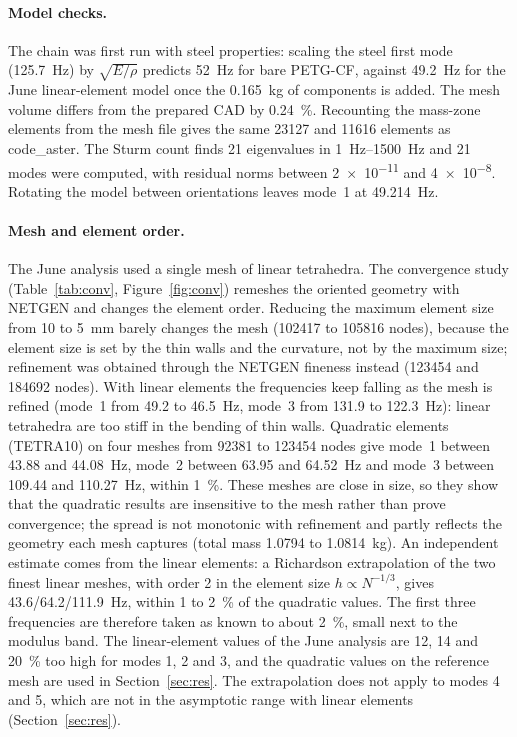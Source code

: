 \documentclass[11pt]{article}
\begin{document}
\paragraph{Model checks.} The chain was first run with steel properties: scaling the steel first mode
(\SI{125.7}{Hz}) by $\sqrt{E/\rho}$ predicts \SI{52}{Hz} for bare PETG-CF, against \SI{49.2}{Hz} for the June
linear-element model once the \SI{0.165}{kg} of components is added. The mesh volume differs from the prepared CAD by \SI{0.24}{\%}. Recounting the
mass-zone elements from the mesh file gives the same \num{23127} and \num{11616} elements as code\_aster. The Sturm count
finds 21 eigenvalues in \SIrange{1}{1500}{Hz} and 21 modes were computed, with residual norms between
\num{2e-11} and \num{4e-8}. Rotating the model between orientations leaves mode~1 at \SI{49.214}{Hz}.

\paragraph{Mesh and element order.} The June analysis used a single mesh of linear tetrahedra. The convergence study
(Table~\ref{tab:conv}, Figure~\ref{fig:conv}) remeshes the oriented geometry with NETGEN and changes the element order.
Reducing the maximum element size from 10 to \SI{5}{mm} barely changes the mesh (\num{102417} to \num{105816} nodes),
because the element size is set by the thin walls and the curvature, not by the maximum size; refinement was obtained
through the NETGEN fineness instead (\num{123454} and \num{184692} nodes). With linear elements the frequencies keep
falling as the mesh is refined (mode~1 from 49.2 to \SI{46.5}{Hz}, mode~3 from 131.9 to \SI{122.3}{Hz}): linear
tetrahedra are too stiff in the bending of thin walls. Quadratic elements (TETRA10) on four meshes from \num{92381} to
\num{123454} nodes give mode~1 between 43.88 and \SI{44.08}{Hz}, mode~2 between 63.95 and \SI{64.52}{Hz} and mode~3
between 109.44 and \SI{110.27}{Hz}, within \SI{1}{\%}. These meshes are close in size, so they show that the quadratic
results are insensitive to the mesh rather than prove convergence; the spread is not monotonic with refinement and
partly reflects the geometry each mesh captures (total mass 1.0794 to \SI{1.0814}{kg}). An independent estimate comes
from the linear elements: a Richardson extrapolation of the two finest linear meshes, with order 2 in the element size
$h\propto N^{-1/3}$, gives 43.6/64.2/\SI{111.9}{Hz}, within 1 to \SI{2}{\%} of the quadratic values. The first three
frequencies are therefore taken as known to about \SI{2}{\%}, small next to the modulus band. The linear-element values
of the June analysis are 12, 14 and \SI{20}{\%} too high for modes 1, 2 and 3, and the quadratic values on the
reference mesh are used in Section~\ref{sec:res}. The extrapolation does not apply to modes 4 and 5, which are not in
the asymptotic range with linear elements (Section~\ref{sec:res}).
\end{document}
